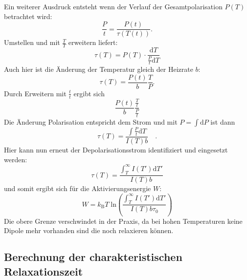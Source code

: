         Ein weiterer Ausdruck entsteht wenn der Verlauf der Gesamtpolarisation $P(T)$ betrachtet wird:
        \begin{equation}
            \frac{P}{t} = \frac{P(t)}{\tau(T(t))}.
        \end{equation}
        Umstellen und mit $\frac{T}{T}$ erweitern liefert:
        \begin{equation}
            \tau(T) = P(T) \cdot \frac{\text{d}T}{\frac{P}{t}\text{d}T}
        \end{equation}
        Auch hier ist die Änderung der Temperatur gleich der Heizrate $b$:
        \begin{equation}
            \tau(T) = \frac{P(t)}{b}\frac{T}{P}.
        \end{equation}
        Durch Erweitern mit $\frac{t}{t}$ ergibt sich
        \begin{equation}
            \frac{P(t)}{b} \frac{\frac{T}{t}}{\frac{P}{t}}
        \end{equation}
        Die Änderung Polarisation entspricht dem Strom und mit $P = \int \text{d}P$ ist dann
        \begin{equation}
            \tau(T) = \frac{\int \frac{P}{t}\text{d}T}{I(T)b} \quad .
        \end{equation}
        Hier kann nun erneut der Depolarisationsstrom identifiziert und eingesetzt werden:
        \begin{equation}
            \tau(T) = \frac{\int_T^\infty I(T')\text{d}T'}{I(T)b}
        \end{equation}
        und somit ergibt sich für die Aktivierungsenergie $W$:
        \begin{equation}
            W = k_\text{B}T\;\text{ln}\left( \frac{\int_T^\infty I(T')\text{d}T'}{I(T)b\tau_0}\right)
            \label{eqn:int}
        \end{equation}
        Die obere Grenze verschwindet in der Praxis, da bei hohen Temperaturen keine Dipole mehr vorhanden sind die noch relaxieren können.

\subsection{Berechnung der charakteristischen Relaxationszeit}
        
